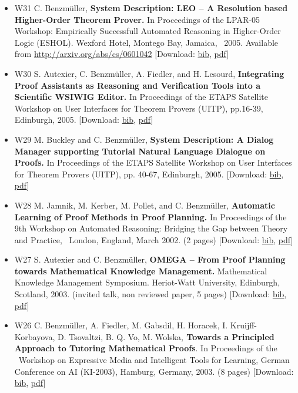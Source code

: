 \documentclass{article}
\newcommand{\tmtextbf}[1]{{\bfseries{#1}}}
\newenvironment{itemizedot}{\begin{itemize} \renewcommand{\labelitemi}{$\bullet$}\renewcommand{\labelitemii}{$\bullet$}\renewcommand{\labelitemiii}{$\bullet$}\renewcommand{\labelitemiv}{$\bullet$}}{\end{itemize}}
\begin{document}
\begin{itemizedot}
  \item [W31] C. Benzm\"uller, \tmtextbf{System Description: LEO -- A
  Resolution based Higher-Order Theorem Prover.} In Proceedings of the LPAR-05
  Workshop: Empirically Successfull Automated Reasoning in Higher-Order Logic
  (ESHOL). Wexford Hotel, Montego Bay, Jamaica, \ 2005. Available from
  \href{http://arxiv.org/abs/cs/0601042}{http://arxiv.org/abs/cs/0601042}
  {\color{grey} [Download: {\small \href{../papers/W31.bib}{bib},
  \href{../papers/W31.pdf}{pdf}}]}
  
  \item [W30] S. Autexier, C. Benzm\"uller, A. Fiedler, and H. Lesourd,
  \tmtextbf{Integrating Proof Assistants as Reasoning and Verification Tools
  into a Scientific WSIWIG Editor.} In Proceedings of the ETAPS Satellite
  Workshop on User Interfaces for Theorem Provers (UITP), pp.16-39, Edinburgh,
  2005. {\color{grey} [Download: {\small \href{../papers/W30.bib}{bib},
  \href{../papers/W30.pdf}{pdf}}]}
  
  \item [W29] M. Buckley and C. Benzm\"uller, \tmtextbf{System Description: A
  Dialog Manager supporting Tutorial Natural Language Dialogue on Proofs.} In
  Proceedings of the ETAPS Satellite Workshop on User Interfaces for Theorem
  Provers (UITP), pp. 40-67, Edinburgh, 2005. {\color{grey} [Download: {\small
  \href{../papers/W29.bib}{bib}, \href{../papers/W29.pdf}{pdf}}]}
  
  \item [W28] M. Jamnik, M. Kerber, M. Pollet, and {\small C. Benzm\"uller,
  \tmtextbf{Automatic Learning of Proof Methods in Proof Planning.}} {\small
  In Proceedings of the 9th Workshop on Automated Reasoning: Bridging the Gap
  between Theory and Practice, \ London, England, March 2002. (2 pages)}
  {\color{grey} [Download: {\small \href{../papers/W28.bib}{bib}}, {\small
  \href{../papers/W28.pdf}{pdf}}]}
  
  \item [W27] S. Autexier and {\small C. Benzm\"uller,} \tmtextbf{OMEGA --
  From Proof Planning towards Mathematical Knowledge Management.} Mathematical
  Knowledge Management Symposium. Heriot-Watt University, Edinburgh, Scotland,
  2003. (invited talk, non reviewed paper, 5 pages) {\color{grey} [Download:
  {\small \href{../papers/W27.bib}{bib}}, {\small
  \href{../papers/W27.pdf}{pdf}}]}
  
  \item [W26] {\small C. Benzm\"uller, A. Fiedler, M. Gabsdil, H. Horacek, I.
  Kruijff-Korbayova, D. Tsovaltzi, B. Q. Vo, M. Wolska,\tmtextbf{ Towards a
  Principled Approach to Tutoring Mathematical Proofs}. {\small In Proceedings
  of the \ Workshop on Expressive Media and Intelligent Tools for Learning,
  German Conference on AI (KI-2003), Hamburg, Germany, 2003. }(8 pages)
  {\color{grey} [Download: \href{../papers/W26.bib}{bib},
  \href{../papers/W26.pdf}{pdf}]}}
  

\end{itemizedot}
\end{document}
